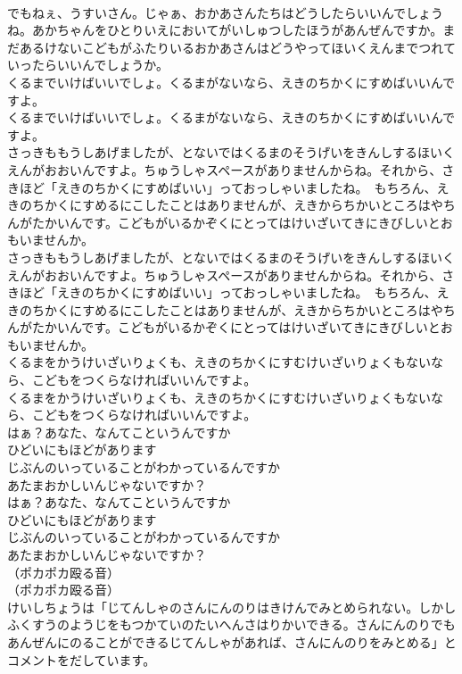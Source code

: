 \documentclass[8pt]{extreport}
\begin{document}
\begin{CJK}{UTF8}{min}
\\	でもねぇ、うすいさん。じゃぁ、おかあさんたちはどうしたらいいんでしょうね。あかちゃんをひとりいえにおいてがいしゅつしたほうがあんぜんですか。まだあるけないこどもがふたりいるおかあさんはどうやってほいくえんまでつれていったらいいんでしょうか。
\\	くるまでいけばいいでしょ。くるまがないなら、えきのちかくにすめばいいんですよ。
\\	くるまでいけばいいでしょ。くるまがないなら、えきのちかくにすめばいいんですよ。
\\	さっきももうしあげましたが、とないではくるまのそうげいをきんしするほいくえんがおおいんですよ。ちゅうしゃスペースがありませんからね。それから、さきほど「えきのちかくにすめばいい」っておっしゃいましたね。　もちろん、えきのちかくにすめるにこしたことはありませんが、えきからちかいところはやちんがたかいんです。こどもがいるかぞくにとってはけいざいてきにきびしいとおもいませんか。
\\	さっきももうしあげましたが、とないではくるまのそうげいをきんしするほいくえんがおおいんですよ。ちゅうしゃスペースがありませんからね。それから、さきほど「えきのちかくにすめばいい」っておっしゃいましたね。　もちろん、えきのちかくにすめるにこしたことはありませんが、えきからちかいところはやちんがたかいんです。こどもがいるかぞくにとってはけいざいてきにきびしいとおもいませんか。
\\	くるまをかうけいざいりょくも、えきのちかくにすむけいざいりょくもないなら、こどもをつくらなければいいんですよ。
\\	くるまをかうけいざいりょくも、えきのちかくにすむけいざいりょくもないなら、こどもをつくらなければいいんですよ。
\\	はぁ？あなた、なんてこというんですか
\\	ひどいにもほどがあります
\\	じぶんのいっていることがわかっているんですか
\\	あたまおかしいんじゃないですか？
\\	はぁ？あなた、なんてこというんですか
\\	ひどいにもほどがあります
\\	じぶんのいっていることがわかっているんですか
\\	あたまおかしいんじゃないですか？
\\	（ポカポカ殴る音）
\\	（ポカポカ殴る音）
\\	けいしちょうは「じてんしゃのさんにんのりはきけんでみとめられない。しかしふくすうのようじをもつかていのたいへんさはりかいできる。さんにんのりでもあんぜんにのることができるじてんしゃがあれば、さんにんのりをみとめる」とコメントをだしています。

\end{CJK}
\end{document}
